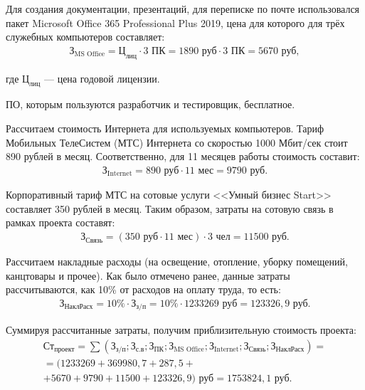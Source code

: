 Для создания документации, презентаций, для переписке по почте использовался пакет Microsoft Office 365 Professional Plus 2019, цена для которого для трёх служебных компьютеров составляет:
\begin{equation}
	\begin{aligned}
		\text{З}_\text{MS Office}=\text{Ц}_\text{лиц} \cdot 3 \text{ ПК} = 1890 \text{ руб} \cdot 3 \text{ ПК} = 5670 \text{ руб},
	\end{aligned}
\end{equation}

где $\text{Ц}_\text{лиц}$ --- цена годовой лицензии.

ПО, которым пользуются разработчик и тестировщик, бесплатное.

Рассчитаем стоимость Интернета для используемых компьютеров. Тариф Мобильных ТелеСистем (МТС) Интернета со скоростью 1000 \mbox{Мбит/сек} стоит 890 рублей в месяц. Соответственно, для 11 месяцев работы стоимость составит:
\begin{equation}
	\begin{aligned}
		\text{З}_\text{Internet}=890\text{ руб} \cdot 11 \text{ мес}= 9790 \text{ руб}.
	\end{aligned}
\end{equation}
 
Корпоративный тариф МТС на сотовые услуги <<Умный бизнес Start>> составляет 350 рублей в месяц. Таким образом, затраты на сотовую связь в рамках проекта составят:
\begin{equation}
	\begin{aligned}
		\text{З}_\text{Связь}=(350\text{ руб} \cdot 11 \text{ мес}) \cdot 3 \text{ чел}= 11500 \text{ руб}.
	\end{aligned}
\end{equation}

Рассчитаем накладные расходы (на освещение, отопление, уборку помещений, канцтовары и прочее).  Как было отмечено ранее, данные затраты рассчитываются, как 10\% от расходов на оплату труда, то есть:
\begin{equation}
	\begin{aligned}
		\text{З}_\text{НаклРасх}=10\% \cdot \text{З}_\text{з/п} = 10\% \cdot 1233269 \text{ руб} = 123326,9 \text{ руб}.
	\end{aligned}
\end{equation}

Суммируя рассчитанные затраты, получим приблизительную стоимость проекта:
\begin{equation}
	\begin{aligned}
		\text{Ст}_\text{проект}= \sum{(\text{З}_\text{з/п}; \text{З}_\text{с.в}; \text{З}_\text{ПК}; \text{З}_\text{MS Office};
		\text{З}_\text{Internet}; \text{З}_\text{Связь}; \text{З}_\text{НаклРасх})} =\\= (1233269 + 369980,7 + 287,5 +\\+ 5670 + 9790 + 11500 + 123326,9) \text{ руб} = 1753824,1 \text{ руб}.
	\end{aligned}
\end{equation}

